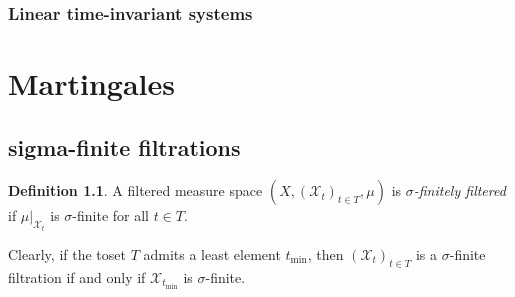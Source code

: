 \documentclass[11pt, a4paper, openany]{book}
\theoremstyle{definition}
\newtheorem{define}{Definition}\newtheorem{exam}{Example}\newtheorem{remark}{Remark}
\begin{document}
\subsection{Linear time-invariant systems}

\chapter{Martingales}
\section{sigma-finite filtrations}
    \begin{define}
        A filtered measure space $(X,(\mathscr{X}_t)_{t\in T},\mu)$ is \textit{$\sigma$-finitely filtered} if $\mu|_{\mathscr{X}_t}$ is $\sigma$-finite for all $t\in T$.
    \end{define}
    Clearly, if the toset $T$ admits a least element $t_\text{min}$, then $(\mathscr{X}_t)_{t\in T}$ is a $\sigma$-finite filtration if and only if $\mathscr{X}_{t_{\text{min}}}$ is $\sigma$-finite.
\end{document}
